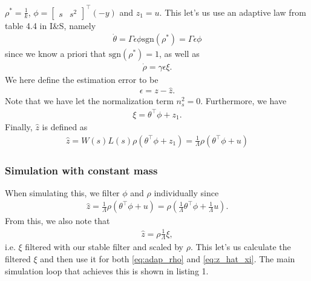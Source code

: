 \documentclass[]{article}
\begin{document}
$\rho^* = \frac{1}{k}$,
$\phi = \begin{bmatrix} s & s^2 \end{bmatrix}^\top (-y)$ and $z_1 = u$.
This let's us use an adaptive law from table 4.4 in I\&S, namely
\begin{equation}\begin{aligned}
\dot \theta = \Gamma \epsilon \phi \text{sgn}(\rho^*) = \Gamma \epsilon \phi
\end{aligned}\end{equation}
since we know a priori that $\text{sgn}(\rho^*) = 1$, as well as
\begin{equation}\begin{aligned}
\label{eq:adap_rho}
\dot \rho = \gamma \epsilon \xi.
\end{aligned}\end{equation}
We here define the estimation error to be
\begin{equation}\begin{aligned}
\epsilon = z - \hat z.
\end{aligned}\end{equation}
Note that we have let the normalization term $n_s^2 = 0$. Furthermore, we have
\begin{equation}\begin{aligned}
\xi = \theta^\top \phi + z_1.
\end{aligned}\end{equation}
Finally, $\hat z$ is defined as
\begin{equation}\begin{aligned}
\label{eq:z_hat}
\hat z = W(s)L(s)\rho(\theta^\top \phi + z_1) = \frac{1}{\Lambda}\rho (\theta^\top \phi + u)
\end{aligned}\end{equation}

\subsubsection{Simulation with constant mass}
When simulating this, we filter $\phi$ and $\rho$ individually since
\begin{equation}\begin{aligned}
\hat z = \frac{1}{\Lambda}\rho (\theta^\top \phi + u)
= \rho(\frac{1}{\Lambda}\theta^\top \phi + \frac{1}{\Lambda} u).
\end{aligned}\end{equation}
From this, we also note that
\begin{equation}\begin{aligned}
\label{eq:z_hat_xi}
\hat z = \rho \frac{1}{\Lambda}\xi,
\end{aligned}\end{equation}
i.e. $\xi$ filtered with our stable filter and scaled by $\rho$. This let's us calculate the filtered $\xi$ and then use it for both \eqref{eq:adap_rho} and \eqref{eq:z_hat_xi}. The main simulation loop that achieves this is shown in listing 1.
\end{document}
